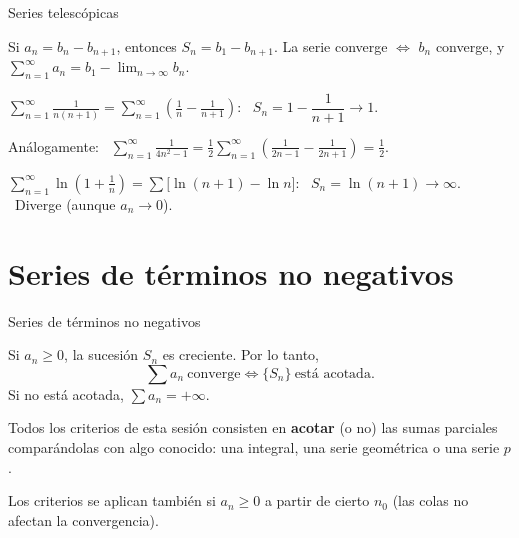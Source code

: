 \documentclass[10pt,aspectratio=169]{beamer}
\begin{document}
\begin{frame}{Series telescópicas}
  \begin{proposicion}
    Si $a_n=b_n-b_{n+1}$, entonces $S_n=b_1-b_{n+1}$. La serie converge $\iff$ $b_n$ converge, y
    $\displaystyle\sum_{n=1}^\infty a_n=b_1-\lim_{n\to\infty}b_n$.
  \end{proposicion}
  \begin{ejemplo}[1]
    $\displaystyle\sum_{n=1}^\infty\frac{1}{n(n+1)}=\sum_{n=1}^\infty\left(\frac1n-\frac1{n+1}\right)$: \
    $S_n=1-\dfrac1{n+1}\to1$.
  \end{ejemplo}
  Análogamente: \ $\displaystyle\sum_{n=1}^\infty\frac{1}{4n^2-1}=\frac12\sum_{n=1}^\infty\left(\frac1{2n-1}-\frac1{2n+1}\right)=\frac12$.
  \begin{ejemplo}
    $\displaystyle\sum_{n=1}^\infty\ln\left(1+\frac1n\right)=\sum\big[\ln(n+1)-\ln n\big]$: \ $S_n=\ln(n+1)\to\infty$. \
    Diverge (aunque $a_n\to0$).
  \end{ejemplo}
\end{frame}

\section{Series de términos no negativos}

\begin{frame}{Series de términos no negativos}
  \begin{teorema}
    Si $a_n\ge0$, la sucesión $S_n$ es creciente. Por lo tanto,
    \[ \sum a_n\ \text{converge}\iff\{S_n\}\ \text{está acotada}. \]
    Si no está acotada, $\sum a_n=+\infty$.
  \end{teorema}
  \begin{idea}
    Todos los criterios de esta sesión consisten en \textbf{acotar} (o no) las sumas parciales comparándolas con algo conocido:
    una integral, una serie geométrica o una serie $p$.
  \end{idea}
  \begin{observacion}
    Los criterios se aplican también si $a_n\ge0$ a partir de cierto $n_0$ (las colas no afectan la convergencia).
  \end{observacion}
\end{frame}
\end{document}
